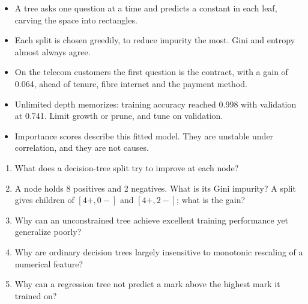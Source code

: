 \begin{chapterrecap}
\begin{itemize}
  \item A tree asks one question at a time and predicts a constant in each leaf, carving the space into rectangles.
  \item Each split is chosen greedily, to reduce impurity the most. Gini and entropy almost always agree.
  \item On the telecom customers the first question is the contract, with a gain of 0.064, ahead of tenure, fibre internet and the payment method.
  \item Unlimited depth memorizes: training accuracy reached 0.998 with validation at 0.741. Limit growth or prune, and tune on validation.
  \item Importance scores describe this fitted model. They are unstable under correlation, and they are not causes.
\end{itemize}
\end{chapterrecap}

\begin{quickcheck}
\begin{enumerate}
  \item What does a decision-tree split try to improve at each node?
  \item A node holds 8 positives and 2 negatives. What is its Gini impurity? A split gives children of $[4+,0-]$ and $[4+,2-]$; what is the gain?
  \item Why can an unconstrained tree achieve excellent training performance yet generalize poorly?
  \item Why are ordinary decision trees largely insensitive to monotonic rescaling of a numerical feature?
  \item Why can a regression tree not predict a mark above the highest mark it trained on?
\end{enumerate}
\end{quickcheck}
